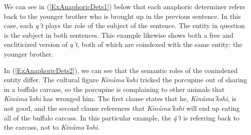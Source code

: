We can see in (\ref{ExAnaphoricDets1}) below that each anaphoric determiner refers back to the younger brother who is brought up in the previous sentence. In this case, each \textit{ą't} plays the role of the subject of the sentence. The entity in question is the subject in both sentences. This example likewise shows both a free and encliticized version of \textit{ą't}, both of which are coindexed with the same entity: the younger brother.

In (\ref{ExAnaphoricDets2}), we can see that the semantic roles of the conindexed entity differ. The cultural figure \textit{Kinúma'kshi} tricked the porcupine out of sharing in a buffalo carcass, so the porcupine is complaining to other animals that \textit{Kinúma'kshi} has wronged him. The first clause states that he, \textit{Kinúma'kshi}, is not good, and the second clause references that \textit{Kinúma'kshi} will end up eating all of the buffalo carcass. In this particular example, the \textit{ą́'t} is referring back to the carcass, not to \textit{Kinúma'kshi}.

